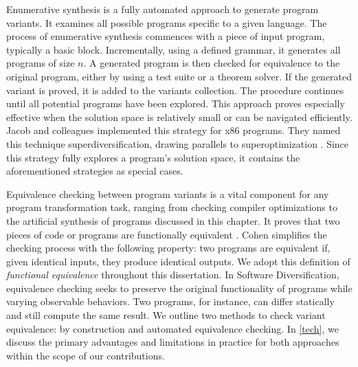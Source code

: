 Enumerative synthesis is a fully automated approach to generate program variants.
It examines all possible programs specific to a given language.
The process of enumerative synthesis commences with a piece of input program, typically a basic block.
Incrementally, using a defined grammar, it generates all programs of size $n$.
A generated program is then checked for equivalence to the original program, either by using a test suite or a theorem solver.
If the generated variant is proved, it is added to the variants collection.
The procedure continues until all potential programs have been explored.
This approach proves especially effective when the solution space is relatively small or can be navigated efficiently.
Jacob and colleagues \cite{jacob2008superdiversifier} implemented this strategy for x86 programs.
They named this technique superdiversification, drawing parallels to superoptimization \cite{Massalin1987}.
Since this strategy fully explores a program's solution space, it contains the aforementioned strategies as special cases.


\label{equivalence:checking}

Equivalence checking between program variants is a vital component for any program transformation task, ranging from checking compiler optimizations \cite{LeCompilers} to the artificial synthesis of programs discussed in this chapter. 
It proves that two pieces of code or programs are functionally equivalent \cite{churchill2019}. 
Cohen \cite{cohen1993operating} simplifies the checking process with the following property: two programs are equivalent if, given identical inputs, they produce identical outputs. 
We adopt this definition of \emph{functional equivalence} throughout this dissertation. 
In Software Diversification, equivalence checking seeks to preserve the original functionality of programs while varying observable behaviors. 
Two programs, for instance, can differ statically and still compute the same result. 
We outline two methods to check variant equivalence: by construction and automated equivalence checking.
In \autoref{tech}, we discuss the primary advantages and limitations in practice for both approaches within the scope of our contributions.

